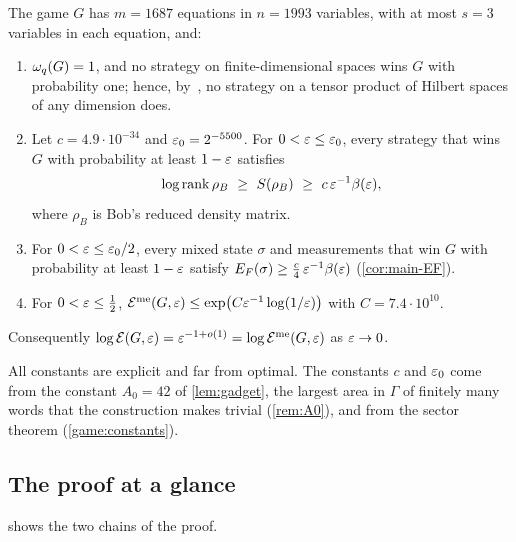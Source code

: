 \begin{theorem}[Theorem~A]\label{thm:main}
The game $G$ has $m=1687$ equations in $n=1993$ variables, with at most $s=3$ variables in each equation, and:
\begin{enumerate}[label=(\alph*),itemsep=1pt]
\item $\omega_{q}(G)=1$, and no strategy on finite-dimensional spaces wins $G$ with probability one; hence, by~\cite[Thm.~3.2]{Slo19}, no
strategy on a tensor product of Hilbert spaces of any dimension does.
\item Let $c=4.9\cdot10^{-34}$ and $\varepsilon_0=2^{-5500}$. For $0<\varepsilon\le\varepsilon_0$, every strategy that wins $G$ with probability at least $1-\varepsilon$
satisfies
\[
\log\rank\rho_B\ \ge\ S(\rho_B)\ \ge\ c\,\eps^{-1}\bfun(\eps),
\]
where $\rho_B$ is Bob's reduced density matrix.
\item For $0<\varepsilon\le\varepsilon_0/2$, every mixed state $\sigma$ and measurements that win $G$ with probability at least $1-\varepsilon$ satisfy
$E_F(\sigma)\ge\frac c4\,\varepsilon^{-1}\beta(\varepsilon)$ (\cref{cor:main-EF}).
\item For $0<\varepsilon\le\frac12$, $\mathcal E^{\mathrm{me}}(G,\varepsilon)\le\exp\bigl(C\varepsilon^{-1}\log(1/\varepsilon)\bigr)$ with $C=7.4\cdot10^{10}$.
\end{enumerate}
Consequently $\log\mathcal E(G,\varepsilon)=\varepsilon^{-1+o(1)}=\log\mathcal E^{\mathrm{me}}(G,\varepsilon)$ as $\varepsilon\to0$.
\end{theorem}

All constants are explicit and far from optimal. The constants $c$ and $\varepsilon_0$ come from the constant $A_0=42$ of \cref{lem:gadget}, the
largest area in $\Gamma$ of finitely many words that the construction makes trivial (\cref{rem:A0}), and from the sector theorem
(\cref{game:constants}).

\subsection{The proof at a glance}

 shows the two chains of the proof.


